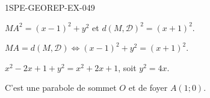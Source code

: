 \begin{corrige}{1SPE-GEOREP-EX-049}

$MA^2 = (x-1)^2 + y^2$ et $d(M, \mathcal{D})^2 = (x+1)^2$.

$MA = d(M, \mathcal{D}) \iff (x-1)^2 + y^2 = (x+1)^2$.

$x^2 - 2x + 1 + y^2 = x^2 + 2x + 1$, soit $\boxed{y^2 = 4x}$.

C'est une parabole de sommet $O$ et de foyer $A(1 ; 0)$.

\end{corrige}
